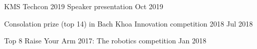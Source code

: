 KMS Techcon 2019 Speaker presentation	\hfill Oct 2019
 
Consolation prize (top 14) in Bach Khoa Innovation competition 2018	\hfill Jul 2018

Top 8 Raise Your Arm 2017: The robotics competition	\hfill Jan 2018
